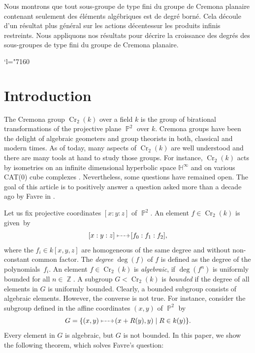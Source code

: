 \documentclass[JEP,XML,SOM,Unicode, NoEqCountersInSection,published]{cedram}
\newcommand{\Changel}{\mathcode`l="7160}
\newcommand{\dradpl}{{\hspace*{-2.5mm}\begin{tikzcd}[ampersand replacement=\&,column sep = scriptsize]\mbox{}\ar[r,dashed]\&\mbox{}\end{tikzcd}\hspace*{-2.5mm}}}
\newcommand{\dratst}{{\hspace*{-2.5mm}\begin{tikzcd}[ampersand replacement=\&,column sep = small]\mbox{}\ar[r,dashed]\&\mbox{}\end{tikzcd}\hspace*{-2mm}}}
\let\drascst\dratst
\newcommand{\dra}{\mathchoice{\dradpl}{\dratst}{\drascst}{\drascst}}
\let\dashrightarrow\dra
\newcommand\dashmapsto{\mapstochar\!\joinrel\dashrightarrow}
\newcommand{\p}{\operatorname{\mathbb{P}}}\let\P\p
\newcommand{\Z}{\operatorname{\mathbb{Z}}}
\newcommand{\Cr}{\operatorname{Cr}}
\theoremstyle{plain}
\theoremstyle{definition}
\begin{document}

\begin{altabstract}
Nous montrons que tout sous-groupe de type fini du groupe de Cremona planaire contenant seulement des éléments algébriques est de degré borné. Cela découle d'un résultat plus général sur les actions \og décentes\fg sur les produits infinis restreints. Nous appliquons nos résultats pour décrire la croissance des degrés des sous-groupes de type fini du groupe de Cremona planaire.
\end{altabstract}

\maketitle
\vspace*{-.5\baselineskip}
\tableofcontents
\mainmatter

\vspace*{-3\baselineskip}\mbox{}
\Changel
\section{Introduction}

The Cremona group $\Cr_2(k)$ over a field $k$ is the group of birational transformations of the projective plane $\p^2$ over $k$. Cremona groups have been the delight of algebraic geometers and group theorists in both, classical and modern times. As of today, many aspects of $\Cr_2(k)$ are well understood and there are many tools at hand to study those groups. For instance, $\Cr_2(k)$ acts by isometries on an infinite dimensional hyperbolic space $\mathbb{H}^\infty$ \cite{Cantat_groupes_birat} and on various CAT(0) cube complexes \cite{lonjou2021actions}. Nevertheless, some questions have remained open. The goal of this article is to positively answer a question asked more than a decade ago by Favre in \cite[Quest.\,1]{favrebourbaki}.

Let us fix projective coordinates $[x:y:z]$ of $\p^2$. An element $f\in\Cr_2(k)$ is given~by
\[
[x:y:z]\dashmapsto [f_0:f_1:f_2],
\]
where the $f_i\in k[x,y,z]$ are homogeneous of the same degree and without non-constant common factor. The \emph{degree} $\deg(f)$ of $f$ is defined as the degree of the polynomials~$f_i$. An element $f\in\Cr_2(k)$ is \emph{algebraic}, if $\deg(f^n)$ is uniformly bounded for all $n\in\Z$. A subgroup $G<\Cr_2(k)$ is \emph{bounded} if the degree of all elements in $G$ is uniformly bounded.
Clearly, a bounded subgroup consists of algebraic elements. However, the converse is not true. For instance, consider the subgroup defined in the affine coordinates $(x,y)$ of $\p^2$ by
\[
G=\{(x,y)\dashmapsto (x+R(y), y)\mid R\in k(y)\}.
\]
Every element in $G$ is algebraic, but $G$ is not bounded. In this paper, we show the following theorem, which solves Favre's question:
\end{document}
